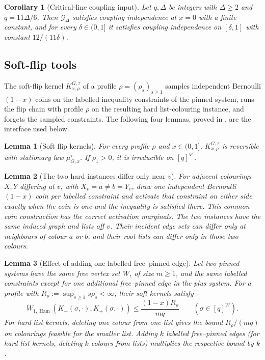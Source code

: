 \documentclass[11pt,reqno]{article}
\theoremstyle{plain}
\newtheorem{lemma}[lemma]{Lemma}
\newtheorem{corollary}[corollary]{Corollary}
\theoremstyle{definition}
\theoremstyle{remark}
\DeclareMathOperator{\Ham}{Ham}
\newcommand{\Deg}{\Delta}                        %
\newcommand{\WHam}{W_{1,\Ham}}                   %
\newcommand{\colours}{[q]}                        %
\newcommand{\Gdeg}{\mathcal{G}_{\Deg}}
\newcommand{\mupin}[3]{\mu_{#1,#3}^{#2}}
\begin{document}
\begin{corollary}[Critical-line coupling input]
\label{cor:critical-line-input}
Let \(q,\Deg\) be integers with \(\Deg\ge2\) and \(q=11\Deg/6\).
Then \(\Gdeg\) satisfies coupling independence at \(x=0\) with a finite
constant, and for every \(\delta\in(0,1]\) it satisfies coupling
independence on \([\delta,1]\) with constant \(12/(11\delta)\).
\end{corollary}

\subsection{Soft-flip tools}
\label{sec:soft-flip-interface}

The soft-flip kernel \(K_{x,\rho}^{G,\tau}\) of a profile
\(\rho=(\rho_s)_{s\ge1}\) samples independent Bernoulli\((1-x)\) coins on
the labelled inequality constraints of the pinned system, runs the flip
chain with profile \(\rho\) on the resulting hard list-colouring
instance, and forgets the sampled constraints.  The following four
lemmas, proved in \cite{ShaoShi2026CI2ZF}, are the interface used below.

\begin{lemma}[Soft flip kernels]\label{lem:soft-stationary}
For every profile \(\rho\) and \(x\in(0,1]\),
\(K_{x,\rho}^{G,\tau}\) is reversible with stationary law
\(\mupin{G}{\tau}{x}\).  If \(\rho_1>0\), it is irreducible on
\(\colours^{V^\tau}\).
\end{lemma}

\begin{lemma}[The two hard instances differ only near \(v\)]
\label{lem:coupled-activation-root-local}
For adjacent colourings \(X,Y\) differing at \(v\), with
\(X_v=a\ne b=Y_v\), draw one independent Bernoulli\((1-x)\) coin per
labelled constraint and activate that constraint on either side exactly
when the coin is one and the inequality is satisfied there.  This
common-coin construction has the correct activation marginals.
The two instances have the same induced graph and lists off \(v\).  Their
incident edge sets can differ only at neighbours of colour \(a\) or
\(b\), and their root lists can differ only in those two colours.
\end{lemma}

\begin{lemma}[Effect of adding one labelled free--pinned edge]
\label{lem:boundary-sensitivity}
Let two pinned systems have the same free vertex set \(W\), of size
\(m\ge1\), and the same labelled constraints except for one additional
free--pinned edge in the plus system.  For a profile with
\(R_\rho:=\sup_{s\ge1}s\rho_s<\infty\), their soft kernels satisfy
\begin{equation}\label{eq:one-boundary-row}
  \WHam(K_-(\sigma,\cdot),K_+(\sigma,\cdot))
  \le\frac{(1-x)R_\rho}{mq}
  \qquad(\sigma\in\colours^W).
\end{equation}
For hard list kernels, deleting one colour from one list gives the bound
\(R_\rho/(mq)\) on colourings feasible for the smaller list.
Adding \(k\) labelled free--pinned edges (for hard list kernels,
deleting \(k\) colours from lists) multiplies the respective bound
by \(k\).
\end{lemma}
\end{document}
